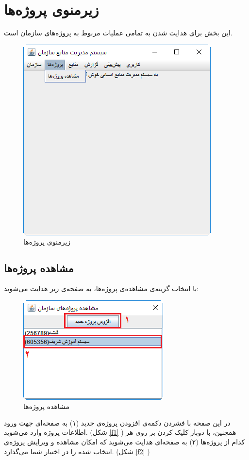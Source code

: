 \newpage
\section{زیرمنوی پروژه‌ها}
این بخش برای هدایت شدن به تمامی عملیات مربوط به پروژه‌های سازمان است.
	\begin{figure}[H]
		\centering
		\includegraphics[scale=0.7]{img/manual/prjSubmenu}
		\caption{زیرمنوی پروژه‌ها}
	\end{figure}
	
\subsection{مشاهده پروژه‌ها}
با انتخاب گزینه‌ی مشاهده‌ی پروژه‌ها، به صفحه‌ی زیر هدایت می‌شوید:
	\begin{figure}[H]
		\centering
		\includegraphics[scale=0.7]{img/manual/viewProjects}
		\caption{مشاهده پروژه‌ها}
	\end{figure}
در این صفحه با فشردن دکمه‌ی افزودن پروژه‌ی جدید (۱) به صفحه‌ای جهت ورود اطلاعات پروژه وارد می‌شوید. (شکل 
\ref{f1}
 )
همچنین، با دوبار کلیک کردن بر روی هر کدام از پروژه‌ها (۲) به صفحه‌ای هدایت‌ می‌شوید که امکان مشاهده و ویرایش پروژه‌ی انتخاب شده را در اختیار شما می‌گذارد. (شکل  
\ref{f2}
 )


